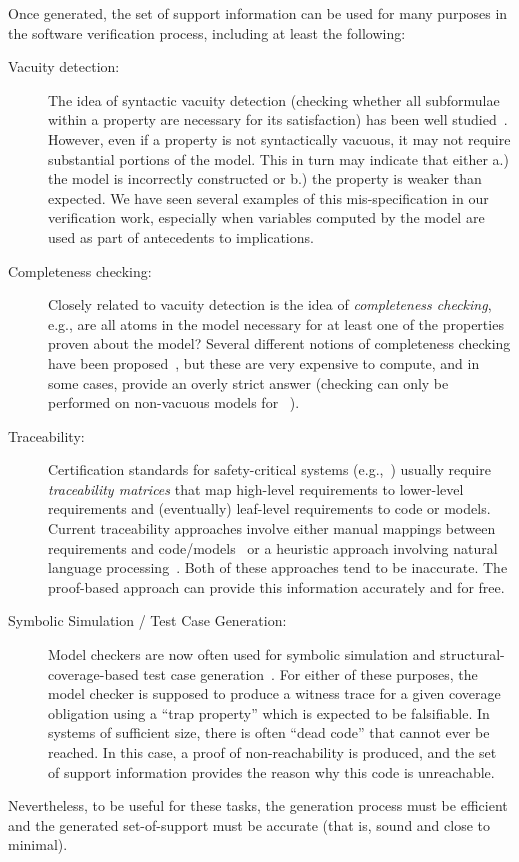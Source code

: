 Once generated, the set of support information can be used for many purposes in the software verification process, including at least the following:
\begin{description}
    \item[Vacuity detection:] The idea of syntactic vacuity detection (checking whether all subformulae within a property are necessary for its satisfaction) has been well studied~\cite{Kupferman}.   However, even if a property is not syntactically vacuous, it may not require substantial portions of the model.  This in turn may indicate that either a.) the model is incorrectly constructed or b.) the property is weaker than expected.  We have seen several examples of this mis-specification in our verification work, especially when variables computed by the model are used as part of antecedents to implications.
    \item[Completeness checking:] Closely related to vacuity detection is the idea of {\em completeness checking}, e.g., are all atoms in the model necessary for at least one of the properties proven about the model?  Several different notions of completeness checking have been proposed~\cite{Chockler, Kupferman}, but these are very expensive to compute, and in some cases, provide an overly strict answer (checking can only be performed on non-vacuous models for~\cite{Kupferman} ).
    \item[Traceability:] Certification standards for safety-critical systems (e.g.,~\cite{DO178B,MOD-0055}) usually require {\em traceability matrices} that map high-level requirements to lower-level requirements and (eventually) leaf-level requirements to code or models.  Current traceability approaches involve either manual mappings between requirements and code/models~\cite{Simulink} or a heuristic approach involving natural language processing~\cite{Huang}.  Both of these approaches tend to be inaccurate.  The proof-based approach can provide this information accurately and for free.
    \item[Symbolic Simulation / Test Case Generation:]  Model checkers are now often used for symbolic simulation and structural-coverage-based test case generation~\cite{Simulink Design Verifier, Our work}.  For either of these purposes, the model checker is supposed to produce a witness trace for a given coverage obligation using a ``trap property'' which is expected to be falsifiable.  In systems of sufficient size, there is often ``dead code'' that cannot ever be reached.  In this case, a proof of non-reachability is produced, and the set of support information provides the reason why this code is unreachable.
\end{description}
\noindent Nevertheless, to be useful for these tasks, the generation process must be efficient and the generated set-of-support must be accurate (that is, sound and close to minimal).  


